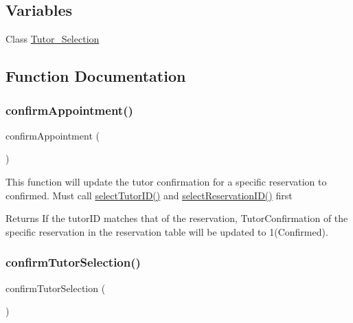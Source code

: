 \subsection*{Variables}
\begin{DoxyCompactItemize}
\item 
Class \mbox{\hyperlink{_tutor___selection_8class_8php_ae781e26d5acd9bf768dc9600a970f35e}{Tutor\+\_\+\+Selection}}
\end{DoxyCompactItemize}


\subsection{Function Documentation}
\mbox{\label{_tutor___selection_8class_8php_a49550acc8d52a9fc8ef060230adfa71e}} 
\subsubsection{\texorpdfstring{confirmAppointment()}{confirmAppointment()}}
{\footnotesize\ttfamily confirm\+Appointment (\begin{DoxyParamCaption}{ }\end{DoxyParamCaption})}

This function will update the tutor confirmation for a specific reservation to confirmed. Must call \mbox{\hyperlink{_tutor___selection_8class_8php_abd658239b3f73bb1c30c51b4f4c4f2a2}{select\+Tutor\+I\+D()}} and \mbox{\hyperlink{_tutor___selection_8class_8php_a78fc1624ae4a44a300484ac00e0b9a96}{select\+Reservation\+I\+D()}} first \begin{DoxyReturn}{Returns}
If the tutor\+ID matches that of the reservation, Tutor\+Confirmation of the specific reservation in the reservation table will be updated to 1(Confirmed). 
\end{DoxyReturn}
\mbox{\label{_tutor___selection_8class_8php_aca7f4f4fe9e0cde1169098ed7bb363df}} 
\subsubsection{\texorpdfstring{confirmTutorSelection()}{confirmTutorSelection()}}
{\footnotesize\ttfamily confirm\+Tutor\+Selection (\begin{DoxyParamCaption}{ }\end{DoxyParamCaption})}

